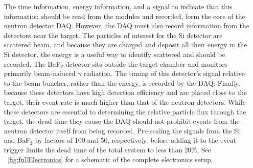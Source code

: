 The time information, energy information, and a signal to indicate that this information should be read from the modules and recorded, form the core of the neutron detector DAQ.  However, the DAQ must also record information from the detectors near the target.  The particles of interest for the Si detector are scattered  beam, and because they are charged and deposit all their energy in the Si detector, the energy is a useful way to identify scattered  and should be recorded.  The BaF$_2$ detector sits outside the target chamber and monitors primarily beam-induced $\gamma$ radiation.  The timing of this detector's signal relative to the beam buncher, rather than the energy, is recorded by the DAQ.  Finally, because these detectors have high detection efficiency and are placed close to the target, their event rate is much higher than that of the neutron detectors.  While these detectors are essential to determining the relative particle flux through the target, the dead time they cause the DAQ should not prohibit events from the neutron detector itself from being recorded.  Pre-scaling the signals from the Si and BaF$_2$ by factors of 100 and 50, respectively, before adding it to the event trigger limits the dead time of the total system to less than 20\%.  See {\fig}~\ref{fig:fullElectronics} for a schematic of the complete electronics setup.
